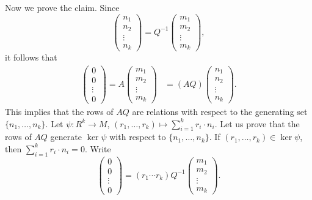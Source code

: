 Now we prove the claim. Since 
\[
\begin{pmatrix}
n_1\\
n_2\\
\vdots\\
n_k	
\end{pmatrix}
=Q^{-1}\begin{pmatrix}
m_1\\
m_2\\
\vdots\\
m_k
\end{pmatrix},
\]
it follows that 
\begin{align*} 
\begin{pmatrix}
0\\
0\\
\vdots\\
0	
\end{pmatrix}
=A\begin{pmatrix}
m_1\\
m_2\\
\vdots\\
m_k	
\end{pmatrix}
&=
(AQ)\begin{pmatrix}
	n_1\\
	n_2\\
	\vdots\\
	n_k
\end{pmatrix}.
\end{align*}
This implies that the rows of $AQ$ are relations with respect to the generating set 
$\{n_1,\dots,n_k\}$. 
Let $\psi\colon R^k\to M$, $(r_1,\dots,r_k)\mapsto \sum_{i=1}^k r_i\cdot n_i$.  
Let us prove that the rows of $AQ$ generate $\ker\psi$ with respect to $\{n_1,\dots,n_k\}$. 
If $(r_1,\dots,r_k)\in \ker\psi$, then 
$\sum_{i=1}^k r_i\cdot n_i=0$. Write 
\[
\begin{pmatrix}
0\\
0\\
\vdots\\
0	
\end{pmatrix}
=(r_1\cdots r_k)Q^{-1}\begin{pmatrix}
m_1\\
m_2\\
\vdots\\
m_k	
\end{pmatrix}.
\]
